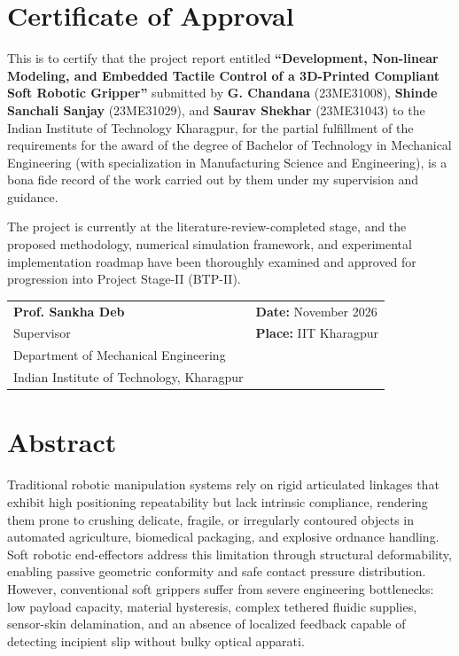 \documentclass[12pt,a4paper]{report}
\begin{document}
\newpage
{}
\setcounter{page}{2}

\chapter*{Certificate of Approval}
This is to certify that the project report entitled \textbf{``Development, Non-linear Modeling, and Embedded Tactile Control of a 3D-Printed Compliant Soft Robotic Gripper''} submitted by \textbf{G. Chandana} (23ME31008), \textbf{Shinde Sanchali Sanjay} (23ME31029), and \textbf{Saurav Shekhar} (23ME31043) to the Indian Institute of Technology Kharagpur, for the partial fulfillment of the requirements for the award of the degree of Bachelor of Technology in Mechanical Engineering (with specialization in Manufacturing Science and Engineering), is a bona fide record of the work carried out by them under my supervision and guidance.

The project is currently at the literature-review-completed stage, and the proposed methodology, numerical simulation framework, and experimental implementation roadmap have been thoroughly examined and approved for progression into Project Stage-II (BTP-II).

\vspace{30mm}
\noindent
\begin{tabular}{@{}p{80mm}p{70mm}@{}}
\textbf{Prof. Sankha Deb} & \textbf{Date:} November 2026 \\
Supervisor & \textbf{Place:} IIT Kharagpur \\
Department of Mechanical Engineering & \\
Indian Institute of Technology, Kharagpur & \\
\end{tabular}

\newpage
\chapter*{Abstract}
Traditional robotic manipulation systems rely on rigid articulated linkages that exhibit high positioning repeatability but lack intrinsic compliance, rendering them prone to crushing delicate, fragile, or irregularly contoured objects in automated agriculture, biomedical packaging, and explosive ordnance handling. Soft robotic end-effectors address this limitation through structural deformability, enabling passive geometric conformity and safe contact pressure distribution. However, conventional soft grippers suffer from severe engineering bottlenecks: low payload capacity, material hysteresis, complex tethered fluidic supplies, sensor-skin delamination, and an absence of localized feedback capable of detecting incipient slip without bulky optical apparati.
\end{document}
